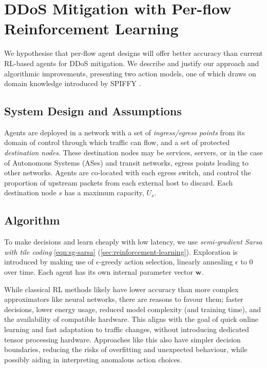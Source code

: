 \documentclass[10pt, times, conference, letterpaper]{IEEEtran}
\newcommand{\wvec}[1]{\ensuremath{\bm{w}_{#1}}}
\begin{document}
\section{DDoS Mitigation with Per-flow Reinforcement Learning}\label{sec:ddos-mitigation-with-per-flow-reinforcement-learning}
We hypothesise that per-flow agent designs will offer better accuracy than current RL-based agents for DDoS mitigation.
We describe and justify our approach and algorithmic improvements, presenting two action models, one of which draws on domain knowledge introduced by SPIFFY \cite{DBLP:conf/ndss/KangGS16}.

\subsection{System Design and Assumptions}
Agents are deployed in a network with a set of \emph{ingress/egress points} from its domain of control through which traffic can flow, and a set of protected \emph{destination nodes}.
These destination nodes may be services, servers, or in the case of Autonomous Systems (ASes) and transit networks, egress points leading to other networks.
Agents are co-located with each egress switch, and control the proportion of upstream packets from each external host to discard.
Each destination node $s$ has a maximum capacity, $U_s$.

\subsection{Algorithm}
To make decisions and learn cheaply with low latency, we use \emph{semi-gradient Sarsa with tile coding} \ref{eqn:sg-sarsa} (\cref{sec:reinforcement-learning}).
Exploration is introduced by making use of $\epsilon$-greedy action selection, linearly annealing $\epsilon$ to 0 over time.
Each agent has its own internal parameter vector $\wvec{}$.

While classical RL methods likely have lower accuracy than more complex approximators like neural networks, there are reasons to favour them; faster decisions, lower energy usage, reduced model complexity (and training time), and the availability of compatible hardware.
This aligns with the goal of quick online learning and fast adaptation to traffic changes, without introducing dedicated tensor processing hardware.
Approaches like this also have simpler decision boundaries, reducing the risks of overfitting and unexpected behaviour, while possibly aiding in interpreting anomalous action choices.
\end{document}
